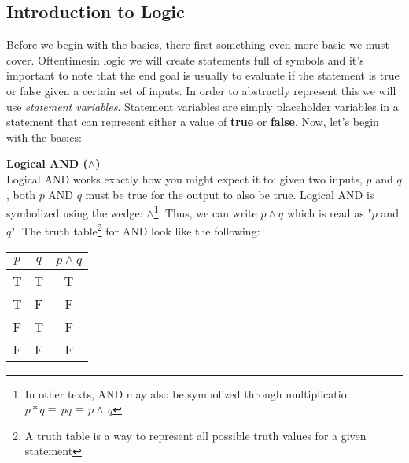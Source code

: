 \documentclass[addpoints]{exam}
\begin{document}
\subsection*{Introduction to Logic}
Before we begin with the basics, there first something even more basic we must cover. Oftentimesin logic we will create statements full of symbols and it's important to note that the end goal is usually to evaluate if the statement is true or false given a certain set of inputs. In order to abstractly represent this we will use \textit{statement variables}. Statement variables are simply placeholder variables in a statement that can represent either a value of \textbf{true} or \textbf{false}. Now, let's begin with the basics:
\begin{tcolorbox}[title= LOGICAL AND,colframe=black,sharp corners,colback=white,colbacktitle=white,coltitle=black]
  \large\textbf{Logical AND ($\land$)} \\
  \normalsize Logical AND works exactly how you might expect it to: given two inputs, $p$ and $q$, both $p$ AND $q$ must be true for the output to also be true. Logical AND is symbolized using the wedge: $\land$\footnote{In other texts, AND may also be symbolized through multiplicatio: $p*q\equiv\,pq\equiv\,p\land\,q$}. Thus, we can write $p \land q$ which is read as "$p$ and $q$". The truth table\footnote{A truth table is a way to represent all possible truth values for a given statement} for AND look like the following: 
  \vspace{0.01in}
  \begin{center}
    \begin{tabular}{ |c|c|c| } 
      \hline
      $p$ & $q$ & $p \land q$ \\ 
      \hline
      T & T & T \\ 
      T & F & F \\ 
      F & T & F \\ 
      F & F & F \\ 
      \hline
    \end{tabular}
  \end{center}
  \vspace{0.01in}
\end{tcolorbox}
\end{document}
